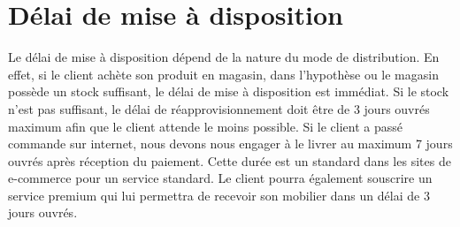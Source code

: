 \section{Délai de mise à disposition}
Le délai de mise à disposition dépend de la nature du mode de distribution.
En effet, si le client achète son produit en magasin, dans l'hypothèse ou le magasin possède un stock suffisant, le délai de mise à disposition est immédiat. Si le stock n'est pas suffisant, le délai de réapprovisionnement doit être de 3 jours ouvrés maximum afin que le client attende le moins possible.
Si le client a passé commande sur internet, nous devons nous engager à le livrer au maximum 7 jours ouvrés après réception du paiement. Cette durée est un standard dans les sites de e-commerce pour un service standard. Le client pourra également souscrire un service premium qui lui permettra de recevoir son mobilier dans un délai de 3 jours ouvrés. 